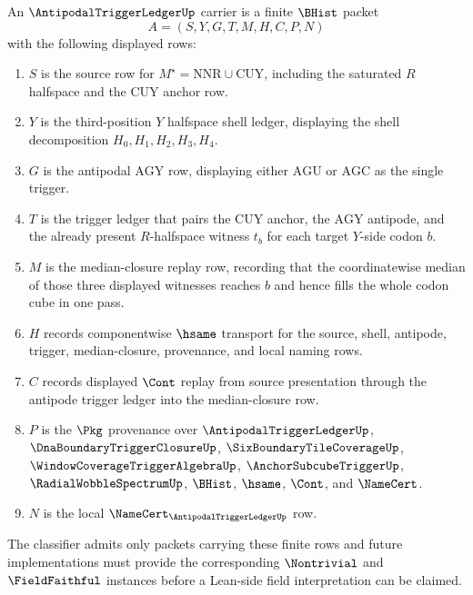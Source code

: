 \begin{definition}
\label{def:antipodal-trigger-ledger-carrier}
An $\AntipodalTriggerLedgerUp$ carrier is a finite $\BHist$ packet
$$
A=(S,Y,G,T,M,H,C,P,N)
$$
with the following displayed rows:
\begin{enumerate}
\item $S$ is the source row for $M^{\star}=\mathrm{NNR}\cup\mathrm{CUY}$, including the saturated $R$ halfspace and the $\mathrm{CUY}$ anchor row.
\item $Y$ is the third-position $Y$ halfspace shell ledger, displaying the shell decomposition $H_{0},H_{1},H_{2},H_{3},H_{4}$.
\item $G$ is the antipodal $\mathrm{AGY}$ row, displaying either $\mathrm{AGU}$ or $\mathrm{AGC}$ as the single trigger.
\item $T$ is the trigger ledger that pairs the $\mathrm{CUY}$ anchor, the $\mathrm{AGY}$ antipode, and the already present $R$-halfspace witness $t_{b}$ for each target $Y$-side codon $b$.
\item $M$ is the median-closure replay row, recording that the coordinatewise median of those three displayed witnesses reaches $b$ and hence fills the whole codon cube in one pass.
\item $H$ records componentwise $\hsame$ transport for the source, shell, antipode, trigger, median-closure, provenance, and local naming rows.
\item $C$ records displayed $\Cont$ replay from source presentation through the antipode trigger ledger into the median-closure row.
\item $P$ is the $\Pkg$ provenance over $\AntipodalTriggerLedgerUp$, $\DnaBoundaryTriggerClosureUp$, $\SixBoundaryTileCoverageUp$, $\WindowCoverageTriggerAlgebraUp$, $\AnchorSubcubeTriggerUp$, $\RadialWobbleSpectrumUp$, $\BHist$, $\hsame$, $\Cont$, and $\NameCert$.
\item $N$ is the local $\NameCert_{\AntipodalTriggerLedgerUp}$ row.
\end{enumerate}
The classifier admits only packets carrying these finite rows and future implementations must provide the corresponding $\Nontrivial$ and $\FieldFaithful$ instances before a Lean-side field interpretation can be claimed.
\end{definition}


